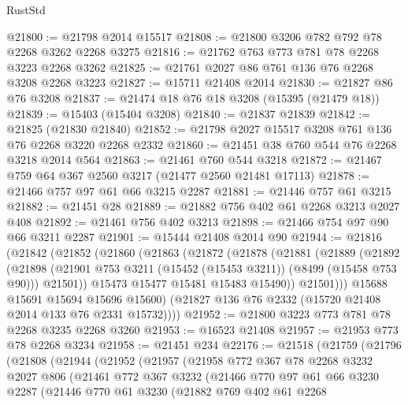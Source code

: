\begin{lexlean}{RustStd}
\begin{coremodule}
@21800 := @21798 @2014 @15517
@21808 := @21800 @3206 @782 @792 @78 @2268 @3262 @2268 @3275
@21816 := @21762 @763 @773 @781 @78 @2268 @3223 @2268 @3262
@21825 := @21761 @2027 @86 @761 @136 @76 @2268 @3208 @2268 @3223
@21827 := @15711 @21408 @2014
@21830 := @21827 @86 @76 @3208
@21837 := @21474 @18 @76 @18 @3208 (@15395 (@21479 @18))
@21839 := @15403 (@15404 @3208)
@21840 := @21837 @21839
@21842 := @21825 (@21830 @21840)
@21852 := @21798 @2027 @15517 @3208 @761 @136 @76 @2268 @3220 @2268 @2332
@21860 := @21451 @38 @760 @544 @76 @2268 @3218 @2014 @564
@21863 := @21461 @760 @544 @3218
@21872 := @21467 @759 @64 @367 @2560 @3217 (@21477 @2560 @21481 @17113)
@21878 := @21466 @757 @97 @61 @66 @3215 @2287
@21881 := @21446 @757 @61 @3215
@21882 := @21451 @28
@21889 := @21882 @756 @402 @61 @2268 @3213 @2027 @408
@21892 := @21461 @756 @402 @3213
@21898 := @21466 @754 @97 @90 @66 @3211 @2287
@21901 := @15444 @21408 @2014 @90
@21944 := @21816
    (@21842
      (@21852
        (@21860
          (@21863
            (@21872
              (@21878
                (@21881
                  (@21889
                    (@21892
                      (@21898
                        (@21901 @753 @3211 (@15452 (@15453 @3211)) (@8499 (@15458 @753 @90)))
                        @21501))
                    @15473
                    @15477
                    @15481
                    @15483
                    @15490))
                @21501)))
          @15688
          @15691
          @15694
          @15696
          @15600)
        (@21827 @136 @76 @2332 (@15720 @21408 @2014 @133 @76 @2331 @15732))))
@21952 := @21800 @3223 @773 @781 @78 @2268 @3235 @2268 @3260
@21953 := @16523 @21408
@21957 := @21953 @773 @78 @2268 @3234
@21958 := @21451 @234
@22176 := @21518
    (@21759
      (@21796
        (@21808
          (@21944
            (@21952
              (@21957
                (@21958
                  @772
                  @367
                  @78
                  @2268
                  @3232
                  @2027
                  @806
                  (@21461
                    @772
                    @367
                    @3232
                    (@21466
                      @770
                      @97
                      @61
                      @66
                      @3230
                      @2287
                      (@21446
                        @770
                        @61
                        @3230
                        (@21882
                          @769
                          @402
                          @61
                          @2268

\end{coremodule}
\end{lexlean}
